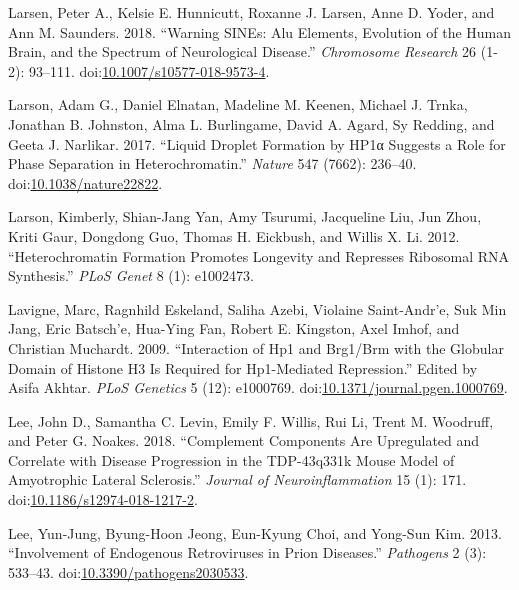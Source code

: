 \documentclass[onehalf,12pt]{beavtex}
\begin{document}
  \hypertarget{ref-LarsenWarningSINEsAlu2018b}{}
  Larsen, Peter A., Kelsie E. Hunnicutt, Roxanne J. Larsen, Anne D. Yoder,
  and Ann M. Saunders. 2018. ``Warning SINEs: Alu Elements, Evolution of
  the Human Brain, and the Spectrum of Neurological Disease.''
  \emph{Chromosome Research} 26 (1-2): 93--111.
  doi:\href{https://doi.org/10.1007/s10577-018-9573-4}{10.1007/s10577-018-9573-4}.
  
  \hypertarget{ref-LarsonLiquiddropletformation2017}{}
  Larson, Adam G., Daniel Elnatan, Madeline M. Keenen, Michael J. Trnka,
  Jonathan B. Johnston, Alma L. Burlingame, David A. Agard, Sy Redding,
  and Geeta J. Narlikar. 2017. ``Liquid Droplet Formation by HP1α Suggests
  a Role for Phase Separation in Heterochromatin.'' \emph{Nature} 547
  (7662): 236--40.
  doi:\href{https://doi.org/10.1038/nature22822}{10.1038/nature22822}.
  
  \hypertarget{ref-LarsonHeterochromatinformationpromotes2012}{}
  Larson, Kimberly, Shian-Jang Yan, Amy Tsurumi, Jacqueline Liu, Jun Zhou,
  Kriti Gaur, Dongdong Guo, Thomas H. Eickbush, and Willis X. Li. 2012.
  ``Heterochromatin Formation Promotes Longevity and Represses Ribosomal
  RNA Synthesis.'' \emph{PLoS Genet} 8 (1): e1002473.
  
  \hypertarget{ref-LavigneInteractionHP1Brg12009}{}
  Lavigne, Marc, Ragnhild Eskeland, Saliha Azebi, Violaine Saint-Andr\a'e,
  Suk Min Jang, Eric Batsch\a'e, Hua-Ying Fan, Robert E. Kingston, Axel
  Imhof, and Christian Muchardt. 2009. ``Interaction of Hp1 and Brg1/Brm
  with the Globular Domain of Histone H3 Is Required for Hp1-Mediated
  Repression.'' Edited by Asifa Akhtar. \emph{PLoS Genetics} 5 (12):
  e1000769.
  doi:\href{https://doi.org/10.1371/journal.pgen.1000769}{10.1371/journal.pgen.1000769}.
  
  \hypertarget{ref-LeeComplementcomponentsare2018}{}
  Lee, John D., Samantha C. Levin, Emily F. Willis, Rui Li, Trent M.
  Woodruff, and Peter G. Noakes. 2018. ``Complement Components Are
  Upregulated and Correlate with Disease Progression in the TDP-43q331k
  Mouse Model of Amyotrophic Lateral Sclerosis.'' \emph{Journal of
  Neuroinflammation} 15 (1): 171.
  doi:\href{https://doi.org/10.1186/s12974-018-1217-2}{10.1186/s12974-018-1217-2}.
  
  \hypertarget{ref-LeeInvolvementEndogenousRetroviruses2013}{}
  Lee, Yun-Jung, Byung-Hoon Jeong, Eun-Kyung Choi, and Yong-Sun Kim. 2013.
  ``Involvement of Endogenous Retroviruses in Prion Diseases.''
  \emph{Pathogens} 2 (3): 533--43.
  doi:\href{https://doi.org/10.3390/pathogens2030533}{10.3390/pathogens2030533}.
  
\end{document}
